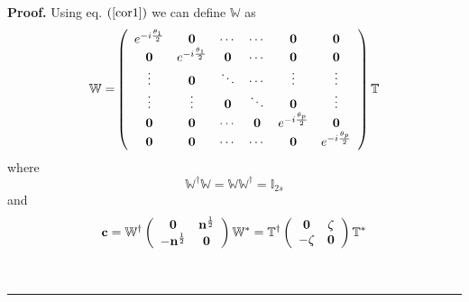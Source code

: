 \documentclass[aps,preprint]{revtex4}%
\newenvironment{proof}[1][Proof]{\noindent\textbf{#1.} }{\ \rule{0.5em}{0.5em}}
\begin{document}
\begin{proof}
Using eq. $\left(  \ref{cor1}\right)  $ we can define $\mathbb{W}$ as
\begin{equation}
\mathbb{W=}\left(
\begin{array}
[c]{cccccc}%
e^{-i\frac{\mathbf{\theta}_{1}}{2}} & \mathbf{0} & \cdots & \cdots &
\mathbf{0} & \mathbf{0}\\
\mathbf{0} & e^{-i\frac{\mathbf{\theta}_{1}}{2}} & \mathbf{0} & \cdots &
\mathbf{0} & \mathbf{0}\\
\mathbf{\vdots} & \mathbf{0} & \mathbf{\ddots} & \cdots & \mathbf{\vdots} &
\mathbf{\vdots}\\
\mathbf{\vdots} & \mathbf{\vdots} & \mathbf{0} & \ddots & \mathbf{0} &
\mathbf{\vdots}\\
\mathbf{0} & \mathbf{0} & \cdots & \mathbf{0} & e^{-i\frac{\mathbf{\theta}%
_{p}}{2}} & \mathbf{0}\\
\mathbf{0} & \mathbf{0} & \cdots & \cdots & \mathbf{0} & e^{-i\frac
{\mathbf{\theta}_{p}}{2}}%
\end{array}
\right)  \mathbb{T}%
\end{equation}
where
\begin{equation}
\mathbb{W}^{\dagger}\mathbb{W=WW}^{\dagger}\mathbb{=I}_{2s}%
\end{equation}
and
\begin{equation}
\mathbf{c}=\mathbb{W}^{\dagger}\left(
\begin{array}
[c]{cc}%
\mathbf{0} & \mathbf{n}^{\frac{1}{2}}\\
-\mathbf{n}^{\frac{1}{2}} & \mathbf{0}%
\end{array}
\right)  \mathbb{W}^{\ast}=\mathbb{T}^{\dagger}\left(
\begin{array}
[c]{cc}%
\mathbf{0} & \mathbf{\zeta}\\
-\mathbf{\zeta} & \mathbf{0}%
\end{array}
\right)  \mathbb{T}^{\ast} \label{cex}%
\end{equation}

\end{proof}
\end{document}
